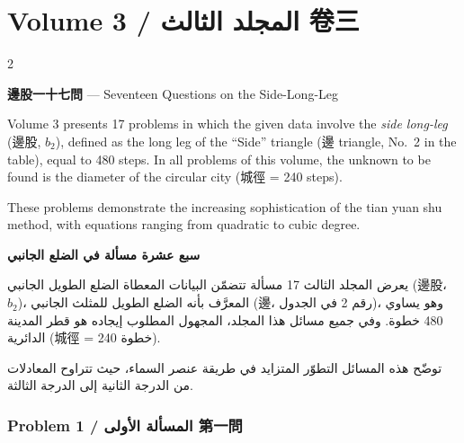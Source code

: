 \documentclass[11pt,a4paper]{article}
\newcommand{\ar}[1]{\arabicfont\beginR #1\endR}
\begin{document}
\newpage


\section{Volume 3 / \ar{المجلد الثالث} \quad 卷三}
\label{sec:vol3}

\begin{paracol}{2}

\textbf{邊股一十七問} --- Seventeen Questions on the Side-Long-Leg

Volume 3 presents 17 problems in which the given data involve the \textit{side long-leg} (邊股, $b_2$), defined as the long leg of the ``Side'' triangle (邊 triangle, No.\ 2 in the table), equal to 480 steps. In all problems of this volume, the unknown to be found is the diameter of the circular city (城徑 = 240 steps).

These problems demonstrate the increasing sophistication of the tian yuan shu method, with equations ranging from quadratic to cubic degree.

\switchcolumn

\ar{\textbf{سبع عشرة مسألة في الضلع الجانبي}}

\vspace{0.3cm}

\ar{يعرض المجلد الثالث 17 مسألة تتضمّن البيانات المعطاة الضلع الطويل الجانبي (邊股، $b_2$)، المعرَّف بأنه الضلع الطويل للمثلث الجانبي (邊، رقم 2 في الجدول)، وهو يساوي 480 خطوة. وفي جميع مسائل هذا المجلد، المجهول المطلوب إيجاده هو قطر المدينة الدائرية (城徑 = 240 خطوة).}

\vspace{0.3cm}

\ar{توضّح هذه المسائل التطوّر المتزايد في طريقة عنصر السماء، حيث تتراوح المعادلات من الدرجة الثانية إلى الدرجة الثالثة.}

\end{paracol}

\subsubsection*{Problem 1 / \ar{المسألة الأولى} \quad 第一問}
\end{document}

